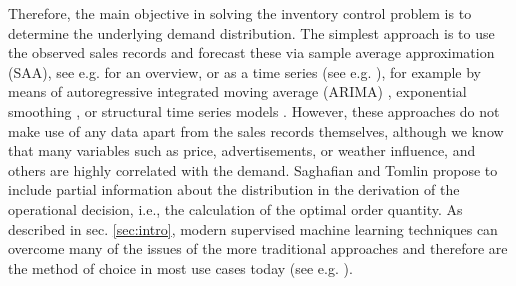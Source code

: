 \documentclass[BCOR=1mm, DIV=calc,10pt,
twoside=true,
twocolumn,
headings=normal]{scrartcl}
\begin{document}
Therefore, the main objective in solving the inventory control problem is to determine the underlying demand distribution. The simplest approach is to use the observed sales records and forecast these via sample average approximation (SAA), see e.g. \cite{shapiro2014} for an overview, or as a time series (see e.g. \cite{alwan2016}), for example by means of autoregressive integrated moving average (ARIMA) \cite{BoxJenkins}, exponential smoothing \cite{ExponentialSmoothing}, or structural time series models \cite{StructuralTS}. However, these approaches do not make use of any data apart from the sales records themselves, although we know that many variables such as price, advertisements, or weather influence, and others are highly correlated with the demand. Saghafian and Tomlin \cite{saghafian2016newsvendor} propose to include partial information about the distribution in the derivation of the operational decision, i.e., the calculation of the optimal order quantity. As described in sec. \ref{sec:intro}, modern supervised machine learning techniques can overcome many of the issues of the more traditional approaches and therefore are the method of choice in most use cases today (see e.g. \cite{tsforecasting,ZHANG199835,rnn,transformer}).
\end{document}
